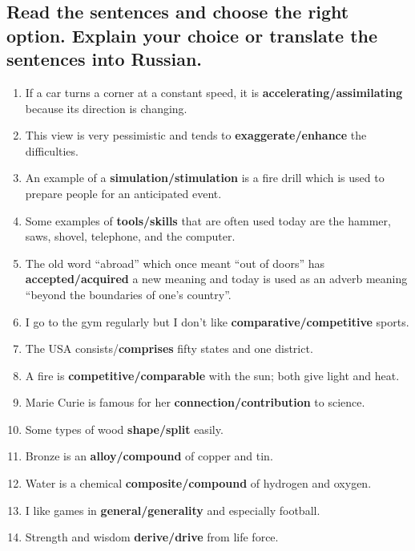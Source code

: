 \subsection*{Read the sentences and choose the right option. Explain your choice or translate the sentences into Russian.}
\begin{enumerate}
      \item If a car turns a corner at a constant speed, it is \textbf{accelerating/assimilating} because its direction is changing.
      \item This view is very pessimistic and tends to \textbf{exaggerate/enhance} the difficulties.
      \item An example of a \textbf{simulation/stimulation} is a fire drill which is used to prepare people for an anticipated event.
      \item Some examples of \textbf{tools/skills} that are often used today are the hammer, saws, shovel, telephone, and the computer.
      \item The old word “abroad” which once meant “out of doors” has \textbf{accepted/acquired} a new meaning and today is used as an adverb meaning “beyond the boundaries of one’s country”.
      \item I go to the gym regularly but I don’t like \textbf{comparative/competitive} sports.
      \item The USA consists/\textbf{comprises} fifty states and one district.
      \item A fire is \textbf{competitive/comparable} with the sun; both give light and heat.
      \item Marie Curie is famous for her \textbf{connection/contribution} to science.
      \item Some types of wood \textbf{shape/split} easily.
      \item Bronze is an \textbf{alloy/compound} of copper and tin.
      \item Water is a chemical \textbf{composite/compound} of hydrogen and oxygen.
      \item I like games in \textbf{general/generality} and especially football.
      \item Strength and wisdom \textbf{derive/drive} from life force.
\end{enumerate}


